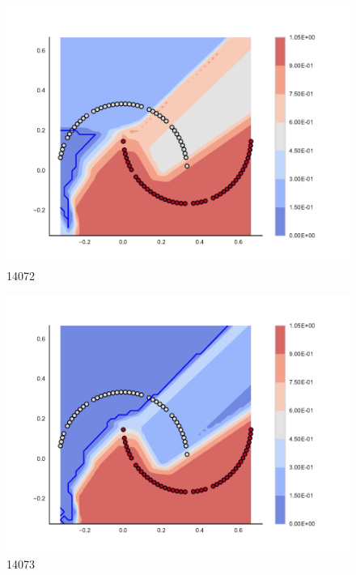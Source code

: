 \begin{subfigure}[b]{0.09\textwidth}
    \includegraphics[clip, trim=2.35cm 1.75cm 4.5cm 0cm,width=\textwidth]{img/convergence/14072.pdf}
    \caption{14072}
    \label{fig:convergence_14072}
\end{subfigure}
%
\begin{subfigure}[b]{0.09\textwidth}
    \includegraphics[clip, trim=2.35cm 1.75cm 4.5cm 0cm,width=\textwidth]{img/convergence/14073.pdf}
    \caption{14073}
    \label{fig:convergence_14073}
\end{subfigure}
%
